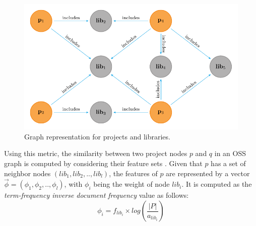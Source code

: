 \begin{figure}[t!]
	\centering
	\includegraphics[width=0.6\columnwidth]{figs/Graph.pdf}
	\caption{Graph representation for projects and libraries.}
	\label{fig:Graph}
\end{figure}




Using this metric, the similarity between two project nodes $p$ and $q$ in an OSS graph is computed 
by considering their feature sets \cite{DiNoia:2012:LOD:2362499.2362501}. Given that $p$ has a 
set of neighbor nodes 
$(lib_{1},lib_{2},..,lib_{l})$, the features of $p$ are represented by a vector 
$\overrightarrow{\phi}=(\phi_{1},\phi_{2},..,\phi_{l})$, with $\phi_{i}$ being the weight of node 
$lib_{i}$. It is computed as the \emph{term-frequency inverse document frequency} value as follows: 
\begin{equation}\label{eqn:TFIDF}
\phi_{i} = f_{lib_{i}} \times log(\frac{ \left | P \right |}{a_{lib_{i}}})
\end{equation}

